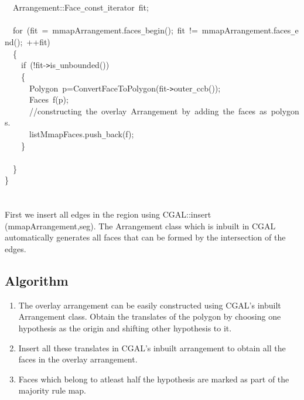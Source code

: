 {\jttstylea \\
\jttstylea \\
\jttstylea ~~\jttstylek Arrangement::Face\verb#_#const\verb#_#iterator~fit;\\
\jttstylea \\
\jttstylea ~~\jttstylee for~\jttstylei (\jttstylek fit~=~mmapArrangement.faces\verb#_#begin\jttstylei ()\jttstylek ;~fit~!=~mmapArrangement.faces\verb#_#end\jttstylei ()\jttstylek ;~++fit\jttstylei )\\
\jttstylea ~~\jttstylei \{\\
\jttstylea ~~~~\jttstylee if~\jttstylei (\jttstylek !fit-\verb#>#is\verb#_#unbounded\jttstylei ())\\
\jttstylea ~~~~\jttstylei \{\\
\jttstylea ~~~~~~\jttstylek Polygon~p=ConvertFaceToPolygon\jttstylei (\jttstylek fit-\verb#>#outer\verb#_#ccb\jttstylei ())\jttstylek ;\\
\jttstylea ~~~~~~\jttstylek Faces~f\jttstylei (\jttstylek p\jttstylei )\jttstylek ;\\
\jttstylea ~~~~~~\jttstyled //constructing~the~overlay~Arrangement~by~adding~the~faces~as~polygons.\\
\jttstylea ~~~~~~\jttstylek listMmapFaces.push\verb#_#back\jttstylei (\jttstylek f\jttstylei )\jttstylek ;\\
\jttstylea ~~~~\jttstylei \}\\
\jttstylea \\
\jttstylea ~~\jttstylei \}\\
\jttstylei \}\\
\jttstylea \\
\jttstylea \jttstylea 
\\

}
First we insert all edges in the region using CGAL::insert (mmapArrangement,seg). The Arrangement class which is inbuilt in CGAL 
automatically generates all faces that can be formed by the intersection of the edges.





\subsection{Algorithm}
\begin{enumerate}
\item
The overlay arrangement can be easily constructed using CGAL's inbuilt Arrangement class. Obtain the translates of the polygon by 
choosing one hypothesis as the origin and shifting other hypothesis to it.
\item
Insert all these translates in CGAL's inbuilt arrangement to obtain all the faces in the overlay arrangement.
\item
Faces which belong to atleast half the hypothesis are marked as part of the majority rule map.
\end{enumerate}



